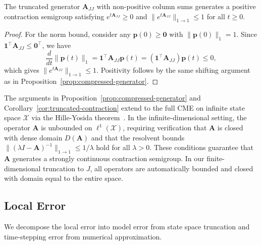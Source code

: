 \documentclass[onefignum,onetabnum]{siamart171218}
\begin{document}
\begin{corollary}
\label{cor:truncated-contraction}
The truncated generator $\mathbf{A}_{JJ}$ with non-positive column sums generates a positive contraction semigroup satisfying $e^{t\mathbf{A}_{JJ}} \geq 0$ and $\|e^{t\mathbf{A}_{JJ}}\|_{1 \to 1} \le 1$ for all $t \ge 0$.
\end{corollary}

\begin{proof}
For the norm bound, consider any $\boldsymbol{p}(0) \geq \mathbf{0}$ with $\|\boldsymbol{p}(0)\|_1 = 1$. Since $\mathbf{1}^\top \mathbf{A}_{JJ} \leq \mathbf{0}^\top$, we have
\begin{equation}
\frac{d}{dt}\|\boldsymbol{p}(t)\|_1 = \mathbf{1}^\top \mathbf{A}_{JJ}\boldsymbol{p}(t) = (\mathbf{1}^\top \mathbf{A}_{JJ})\boldsymbol{p}(t) \leq 0,
\end{equation}
which gives $\|e^{t\mathbf{A}_{JJ}}\|_{1 \to 1} \leq 1$. Positivity follows by the same shifting argument as in Proposition~\ref{prop:compressed-generator}.
\end{proof}

\begin{remark}
\label{rem:infinite-dimensional}
The arguments in Proposition~\ref{prop:compressed-generator} and Corollary~\ref{cor:truncated-contraction} extend to the full CME on infinite state space $\mathcal{X}$ via the Hille-Yosida theorem~\cite{Ethier1986,pazy_1983}. In the infinite-dimensional setting, the operator $\mathbf{A}$ is unbounded on $\ell^1(\mathcal{X})$, requiring verification that $\mathbf{A}$ is closed with dense domain $D(\mathbf{A})$ and that the resolvent bounds $\|(\lambda I - \mathbf{A})^{-1}\|_{1 \to 1} \leq 1/\lambda$ hold for all $\lambda > 0$. These conditions guarantee that $\mathbf{A}$ generates a strongly continuous contraction semigroup. In our finite-dimensional truncation to $J$, all operators are automatically bounded and closed with domain equal to the entire space.
\end{remark}



\subsection{Local Error}

We decompose the local error into model error from state space truncation and time-stepping error from numerical approximation.
\end{document}
